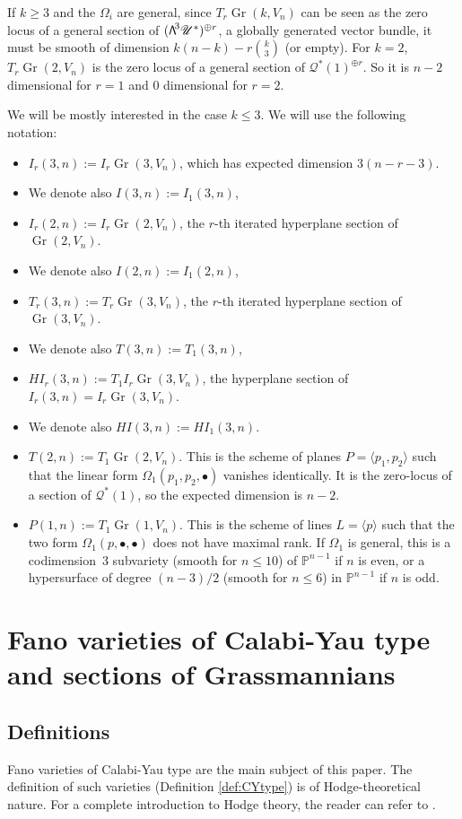 \documentclass[11pt]{article}
\newcommand{\sbullet}{{\scriptstyle\bullet}}
\newcommand\bw[1]{{\hbox{\large$\mathsf{\Lambda}$}^{\!#1}}}
\let\mathcal\mathscr
\theoremstyle{plain}
\theoremstyle{definition}
\DeclareMathOperator{\Gr}{Gr}
\newcommand{\PP}{\mathbb{P}}
\newcommand{\sheaf}[1]{\mathcal{#1}}
\newcommand{\kq}{\sheaf{Q}}
\newcommand{\ku}{\sheaf{U}}
\begin{document}
If $k\ge 3$ and the $\Omega_i$ are general, since $T_r\Gr(k,V_n)$ can be seen as the zero locus of a general section of $(\bw3 \ku^*)^{\oplus r}$, a globally generated vector bundle, it must be smooth of dimension $k(n-k) - r \binom k3$ (or empty). For $k=2$, $T_r\Gr(2,V_n)$ is the zero locus of a general section of $\kq^*(1)^{\oplus r}$. So it is $n-2$ dimensional for $r=1$ and $0$ dimensional for $r=2$.

We will be mostly interested in the case $k \leq 3$. We will use the following notation:

\begin{itemize}
\item $I_r(3,n):= I_r \Gr(3,V_n)$, which has expected dimension $3(n-r-3)$.
\item[] We denote also $I(3,n):=I_1(3,n)$,
\item $I_r(2,n):= I_r \Gr(2,V_n)$, the $r$-th iterated hyperplane section of $\Gr(2,V_n)$.
\item[] We denote also $I(2,n):=I_1(2,n)$,
\item $T_r(3,n):= T_r \Gr(3,V_n)$, the $r$-th iterated hyperplane section of $\Gr(3,V_n)$.
\item[]We denote also $T(3,n):=T_1(3,n)$,
\item $HI_r(3,n):= T_1 I_r \Gr(3,V_n)$, the hyperplane section of $I_r(3,n)=I_r\Gr(3,V_n)$.
\item[]We denote also $HI(3,n):=HI_1(3,n)$.
\item $T(2,n):= T_1 \Gr(2,V_n)$. This is the scheme of planes $P=\langle p_1, p_2\rangle$ such that
the linear form $\Omega_1(p_1, p_2,\sbullet)$ vanishes identically. It is the zero-locus of a section of
$\kq^* (1)$, so the expected dimension is $n-2$.
\item $P(1,n):= T_1 \Gr(1,V_n)$. This is the scheme of lines $L=\langle p\rangle$ such that the
two form $\Omega_1(p,\sbullet,\sbullet)$ does not have maximal rank. If $\Omega_1$ is general,
this is a codimension~$3$ subvariety (smooth for $n\leq 10$) of $\PP^{n-1}$ if $n$ is even, or a
hypersurface of degree $(n-3)/2$ (smooth for $n \leq 6$) in $\PP^{n-1}$ if $n$ is odd.
\end{itemize}

\section{Fano varieties of Calabi-Yau type and sections of Grassmannians}\label{sec:CYtype}

\subsection{Definitions}
Fano varieties of Calabi-Yau type are the main subject of this paper. The definition
of such varieties (Definition \ref{def:CYtype}) is of Hodge-theoretical nature.
For a complete introduction to Hodge theory, the reader can refer to \cite{voisin-book}.
\end{document}
